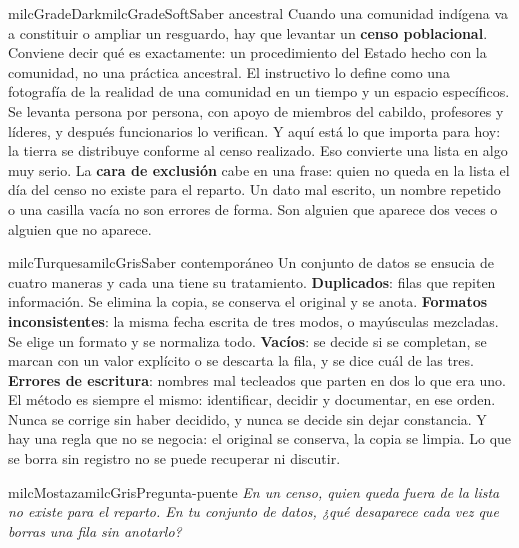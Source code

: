 \documentclass[11pt,letterpaper]{article}
\begin{document}
\begin{softbox}{milcGradeDark}{milcGradeSoft}{Saber ancestral}
Cuando una comunidad indígena va a constituir o ampliar un resguardo, hay que levantar un \textbf{censo poblacional}. Conviene decir qué es exactamente: un procedimiento del Estado hecho con la comunidad, no una práctica ancestral. El instructivo lo define como una fotografía de la realidad de una comunidad en un tiempo y un espacio específicos. Se levanta persona por persona, con apoyo de miembros del cabildo, profesores y líderes, y después funcionarios lo verifican. Y aquí está lo que importa para hoy: la tierra se distribuye conforme al censo realizado. Eso convierte una lista en algo muy serio. La \textbf{cara de exclusión} cabe en una frase: quien no queda en la lista el día del censo no existe para el reparto. Un dato mal escrito, un nombre repetido o una casilla vacía no son errores de forma. Son alguien que aparece dos veces o alguien que no aparece.\par{}
\end{softbox}

\begin{softbox}{milcTurquesa}{milcGris}{Saber contemporáneo}
Un conjunto de datos se ensucia de cuatro maneras y cada una tiene su tratamiento. \textbf{Duplicados}: filas que repiten información. Se elimina la copia, se conserva el original y se anota. \textbf{Formatos inconsistentes}: la misma fecha escrita de tres modos, o mayúsculas mezcladas. Se elige un formato y se normaliza todo. \textbf{Vacíos}: se decide si se completan, se marcan con un valor explícito o se descarta la fila, y se dice cuál de las tres. \textbf{Errores de escritura}: nombres mal tecleados que parten en dos lo que era uno. El método es siempre el mismo: identificar, decidir y documentar, en ese orden. Nunca se corrige sin haber decidido, y nunca se decide sin dejar constancia. Y hay una regla que no se negocia: el original se conserva, la copia se limpia. Lo que se borra sin registro no se puede recuperar ni discutir.
\end{softbox}

\begin{softbox}{milcMostaza}{milcGris}{Pregunta-puente}
\textit{En un censo, quien queda fuera de la lista no existe para el reparto. En tu conjunto de datos, ¿qué desaparece cada vez que borras una fila sin anotarlo?}
\end{softbox}
\end{document}

